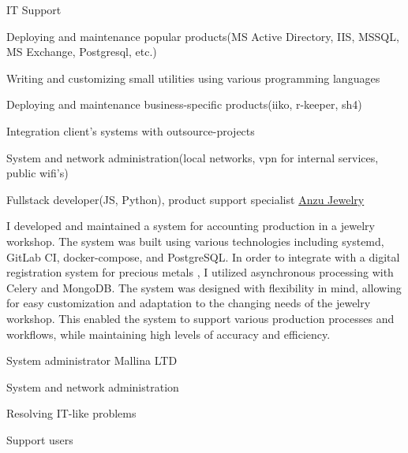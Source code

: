 \begin{cventries}
  \cventry
    {IT Support} %
    {} %
    {} %
    {} %
    {
      \begin{cvitems} %
        \item {Deploying and maintenance popular products(MS Active Directory, IIS, MSSQL, MS Exchange, Postgresql, etc.)}
        \item {Writing and customizing small utilities using various programming languages}
        \item {Deploying and maintenance business-specific products(iiko, r-keeper, sh4)}
        \item {Integration client's systems with outsource-projects}
        \item {System and network administration(local networks, vpn for internal services, public wifi's)}
      \end{cvitems}
    }
  \cventry
    {Fullstack developer(JS, Python), product support specialist}
    {\href{https://anzujewelry.com/}{Anzu Jewelry}}
    {} %
    {} %
    {
      \begin{cvitems}
        I developed and maintained a system for accounting production in a jewelry workshop.
        The system was built using various technologies including systemd, GitLab CI, docker-compose, and PostgreSQL.
        In order to integrate with a digital registration system for precious metals
        , I utilized asynchronous processing with Celery and MongoDB.
        The system was designed with flexibility in mind, allowing for easy customization and adaptation to the changing needs of the jewelry workshop.
        This enabled the system to support various production processes and workflows, while maintaining high levels of accuracy and efficiency.
      \end{cvitems}
    }
  \cventry
    {System administrator} %
    {Mallina LTD} %
    {} %
    {} %
    {
      \begin{cvitems} %
        \item {System and network administration}
        \item {Resolving IT-like problems}
        \item {Support users}
      \end{cvitems}
    }

\end{cventries}

